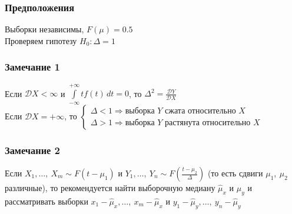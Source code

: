 \documentclass[12pt, a4paper]{article}
\newcommand{\dev}{\mathcal{D}}
\begin{document}
\subsubsection*{Предположения}
Выборки независимы, $F(\mu) = 0.5$\\
Проверяем гипотезу $H_0: \Delta = 1$
\subsubsection*{Замечание 1}
Если $\dev X < \infty$ и $\displaystyle\int\limits_{-\infty}^{+\infty} tf(t)\, dt = 0$, то $\Delta^2 = \frac{\dev Y}{\dev X}$\\
Если $\dev X = +\infty$, то $\begin{cases}
    \Delta < 1\Rightarrow \text{выборка $Y$ сжата относительно $X$}\\
    \Delta > 1\Rightarrow \text{выборка $Y$ растянута относительно $X$}
\end{cases}$
\subsubsection*{Замечание 2}
Если $X_1,\dots,\ X_m \sim F(t - \mu_1)$ и $Y_1,\dots,\ Y_n \sim F\left( \frac{t - \mu_2}{\Delta} \right)$ (то есть сдвиги $\mu_1,\ \mu_2$ различные), то рекомендуется найти выборочную медиану $\hat \mu_x$ и $\hat \mu_y$ и рассматривать выборки $x_1 - \hat \mu_x,\dots,\ x_m - \hat \mu_x$ и $y_1 - \hat \mu_y,\dots,\ y_n - \hat\mu_y$
\end{document}
